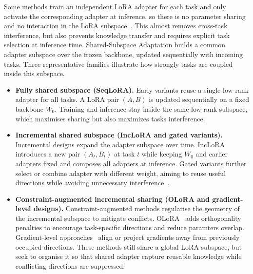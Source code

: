 \documentclass{article}
\theoremstyle{plain}
\theoremstyle{definition}
\theoremstyle{remark}
\begin{document}
Some methods train an independent LoRA adapter for each task and only activate the corresponding adapter at inference, so there is no parameter sharing and no interaction in the LoRA subspace~\citep{Yu_2024_CVPR}. This almost removes cross-task interference, but also prevents knowledge transfer and requires explicit task selection at inference time.
Shared-Subspace Adaptation builds a common adapter subspace over the frozen backbone, updated sequentially with incoming tasks. Three representative families illustrate how strongly tasks are coupled inside this subspace.
\begin{itemize}
    \item \textbf{Fully shared subspace (SeqLoRA).}
    Early variants reuse a single low-rank adapter for all tasks. A LoRA pair $(A,B)$ is updated sequentially on a fixed backbone $W_0$. Training and inference stay inside the same low-rank subspace, which maximises sharing but also maximizes tasks interference.
    \item \textbf{Incremental shared subspace (IncLoRA and gated variants).}
    Incremental designs expand the adapter subspace over time. IncLoRA introduces a new pair $(A_t,B_t)$ at task $t$ while keeping $W_0$ and earlier adapters fixed and composes all adapters at inference.
    Gated variants further select or combine adapter with different weight, aiming to reuse useful directions while avoiding unnecessary interference~\citep{Gao_2023_ICCV,10.1145/3730436.3730456,zhao-etal-2024-sapt,cheng2025exploiting,wu2025sdlorascalabledecoupledlowrank}.
    \item \textbf{Constraint-augmented incremental sharing (OLoRA and gradient-level designs).}
    Constraint-augmented methods regularise the geometry of the incremental subspace to mitigate conflicts. OLoRA~\citep{wang2023orthogonal} adds orthogonality penalties to encourage task-specific directions and reduce paramters overlap. Gradient-level approaches~\citep{Liang_2024_CVPR,yang2024parametercollisionhinderingcontinual} align or project gradients away from previously occupied directions. These methods still share a global LoRA subspace, but seek to organise it so that shared adapter capture reusable knowledge while conflicting directions are suppressed.
\end{itemize}
\end{document}
